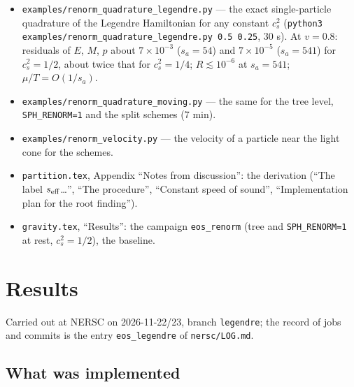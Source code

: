 \documentclass[11pt,aps,preprint,nofootinbib,superscriptaddress,tightenlines]{revtex4-2}
\begin{document}
\begin{itemize}
\item \nolinkurl{examples/renorm_quadrature_legendre.py} — the exact single-particle quadrature of the Legendre Hamiltonian for any constant $c_s^2$
  (\texttt{python3 examples/renorm\_quadrature\_legendre.py 0.5 0.25}, 30 s).  At $v=0.8$: residuals of $E$, $M$, $p$ about $7\times10^{-3}$ ($s_a=54$) and
  $7\times10^{-5}$ ($s_a=541$) for $c_s^2=1/2$, about twice that for $c_s^2=1/4$; $R\lesssim10^{-6}$ at $s_a=541$; $\mu/T=O(1/s_a)$.
\item \nolinkurl{examples/renorm_quadrature_moving.py} — the same for the tree level, \texttt{SPH\_RENORM=1} and the split schemes (7 min).
\item \nolinkurl{examples/renorm_velocity.py} — the velocity of a particle near the light cone for the schemes.
\item \nolinkurl{partition.tex}, Appendix ``Notes from discussion'': the derivation (``The label $s_{\rm eff}$\ldots'', ``The procedure'', ``Constant speed of sound'',
  ``Implementation plan for the root finding'').
\item \nolinkurl{gravity.tex}, ``Results'': the campaign \texttt{eos\_renorm} (tree and \texttt{SPH\_RENORM=1} at rest, $c_s^2=1/2$), the baseline.
\end{itemize}

\section{Results}
\label{sec:results}

Carried out at NERSC on 2026-11-22/23, branch \texttt{legendre}; the record of jobs and commits is the entry \texttt{eos\_legendre} of
\nolinkurl{nersc/LOG.md}.

\subsection{What was implemented}
\end{document}

